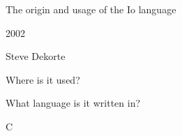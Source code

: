 \begin{frame}
  \begin{center}
    The origin and usage of the Io language
  \end{center}
\end{frame}

\begin{frame}
  \begin{center}
    2002
  \end{center}
\end{frame}

\begin{frame}
  \begin{center}
    Steve Dekorte
  \end{center}
\end{frame}

\begin{frame}
  \begin{center}
    Where is it used?
  \end{center}
\end{frame}

\begin{frame}
  \begin{center}
    What language is it written in?
    
    C
  \end{center}
\end{frame}